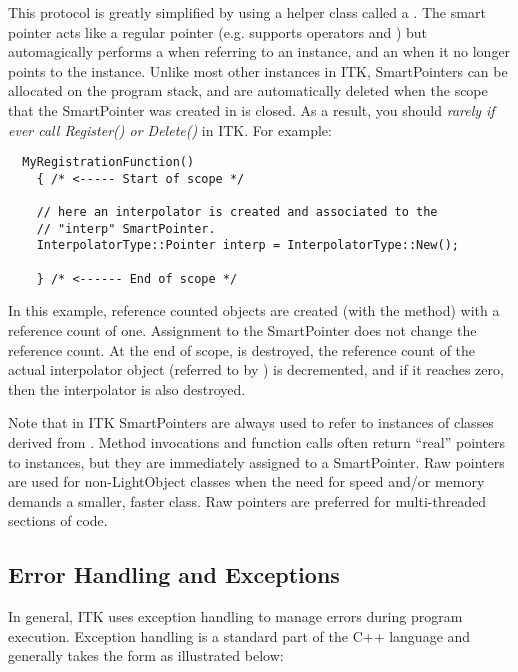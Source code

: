 This protocol is greatly simplified by using a helper class called a
. The smart pointer acts like a regular pointer
(e.g. supports operators \code{->} and \code{*}) but automagically performs a
 when referring to an instance, and an 
when it no longer points to the instance. Unlike most other instances in
ITK, SmartPointers can be allocated on the program stack, and are
automatically deleted when the scope that the SmartPointer was created in
is closed. As a result, you should \emph{rarely if ever call Register() or
Delete()} in ITK. For example:

\small
\begin{verbatim}
  MyRegistrationFunction()
    { /* <----- Start of scope */

    // here an interpolator is created and associated to the
    // "interp" SmartPointer.
    InterpolatorType::Pointer interp = InterpolatorType::New();

    } /* <------ End of scope */
\end{verbatim}
\normalsize

In this example, reference counted objects are created (with the 
method) with a reference count of one. Assignment to the SmartPointer
 does not change the reference count. At the end of scope,
 is destroyed, the reference count of the actual interpolator
object (referred to by ) is decremented, and if it reaches zero,
then the interpolator is also destroyed.

Note that in ITK SmartPointers are always used to refer to instances of
classes derived from . Method invocations and function
calls often return ``real'' pointers to instances, but they are immediately
assigned to a SmartPointer. Raw pointers are used for non-LightObject classes when
the need for speed and/or memory demands a smaller, faster class. Raw pointers
are preferred for multi-threaded sections of code.


\subsection{Error Handling and Exceptions}
\label{sec:ErrorHandling}


In general, ITK uses exception handling to manage errors during program
execution. Exception handling is a standard part of the C++ language and
generally takes the form as illustrated below:

